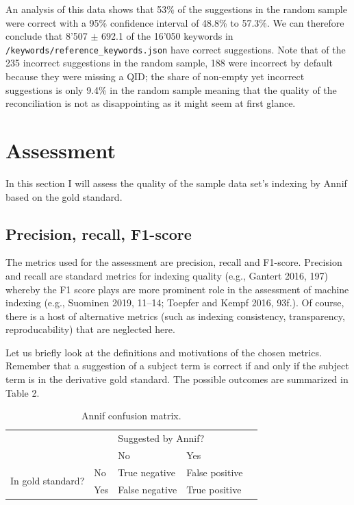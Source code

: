 An analysis of this data shows that 53\% of the suggestions in the
random sample were correct with a 95\% confidence interval of 48.8\% to
57.3\%. We can therefore conclude that 8'507 \(\pm\) 692.1 of the 16'050
keywords in \texttt{/keywords/reference\_keywords.json} have correct
suggestions. Note that of the 235 incorrect suggestions in the random
sample, 188 were incorrect by default because they were missing a QID;
the share of non-empty yet incorrect suggestions is only 9.4\% in the
random sample meaning that the quality of the reconciliation is not as
disappointing as it might seem at first glance.

\hypertarget{assessment}{%
\section{Assessment}\label{assessment}}

In this section I will assess the quality of the sample data set's
indexing by Annif based on the gold standard.

\hypertarget{precision-recall-f1-score}{%
\subsection{Precision, recall,
F1-score}\label{precision-recall-f1-score}}

The metrics used for the assessment are precision, recall and F1-score.
Precision and recall are standard metrics for indexing quality (e.g.,
Gantert 2016, 197) whereby the F1 score plays are more prominent role in
the assessment of machine indexing (e.g., Suominen 2019, 11--14; Toepfer
and Kempf 2016, 93f.). Of course, there is a host of alternative metrics
(such as indexing consistency, transparency, reproducability) that are
neglected here.

Let us briefly look at the definitions and motivations of the chosen
metrics. Remember that a suggestion of a subject term is correct if and
only if the subject term is in the derivative gold standard. The
possible outcomes are summarized in Table 2.

\begin{table}[h]
\centering
\begin{tabular}{lllll}
 &                       & \multicolumn{2}{l}{Suggested by Annif?}            &  \\ \cline{3-4}
 & \multicolumn{1}{l|}{} & \multicolumn{1}{l|}{No} & \multicolumn{1}{l|}{Yes} &  \\ \cline{2-4}
\multicolumn{1}{l|}{\multirow{2}{*}{In gold standard?}} & \multicolumn{1}{l|}{No}  & \multicolumn{1}{l|}{True negative}  & \multicolumn{1}{l|}{False positive} &  \\ \cline{2-4}
\multicolumn{1}{l|}{}                                   & \multicolumn{1}{l|}{Yes} & \multicolumn{1}{l|}{False negative} & \multicolumn{1}{l|}{True positive}  &  \\ \cline{2-4}
\end{tabular}
\caption{Annif confusion matrix.}
\label{tab:confusion-matrix}
\end{table}

